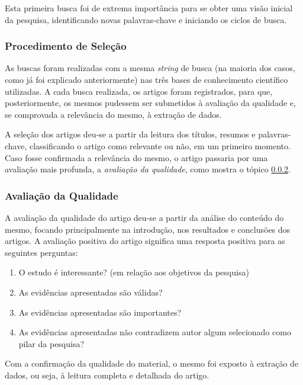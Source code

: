 		Esta primeira busca foi de extrema importância para se obter uma visão inicial da pesquisa, identificando novas palavras-chave e iniciando os ciclos de busca.



		\subsubsection{Procedimento de Seleção}

			As buscas foram realizadas com a mesma \textit{string} de busca (na maioria dos casos, como já foi explicado anteriormente) nas três bases de conhecimento científico utilizadas. A cada busca realizada, os artigos foram registrados, para que, posteriormente, os mesmos pudessem ser submetidos à avaliação da qualidade e, se comprovada a relevância do mesmo, à extração de dados.

			A seleção dos artigos deu-se a partir da leitura dos títulos, resumos e palavras-chave, classificando o artigo como relevante ou não, em um primeiro momento. Caso fosse confirmada a relevância do mesmo, o artigo passaria por uma avaliação mais profunda, a \textit{avaliação da qualidade}, como mostra o tópico \ref{sub:avaliacao_qualidade}.


		\subsubsection{Avaliação da Qualidade}
		\label{sub:avaliacao_qualidade}

			A avaliação da qualidade do artigo deu-se a partir da análise do conteúdo do mesmo, focando principalmente na introdução, nos resultados e conclusões dos artigos. A avaliação positiva do artigo significa uma resposta positiva para as seguintes perguntas:

			\begin{enumerate}
				\item O estudo é interessante? (em relação aos objetivos da pesquisa)
				\item As evidências apresentadas são válidas?
				\item As evidências apresentadas são importantes?
				\item As evidências apresentadas não contradizem autor algum selecionado como pilar da pesquisa?
			\end{enumerate}

			Com a confirmação da qualidade do material, o mesmo foi exposto à extração de dados, ou seja, à leitura completa e detalhada do artigo.

